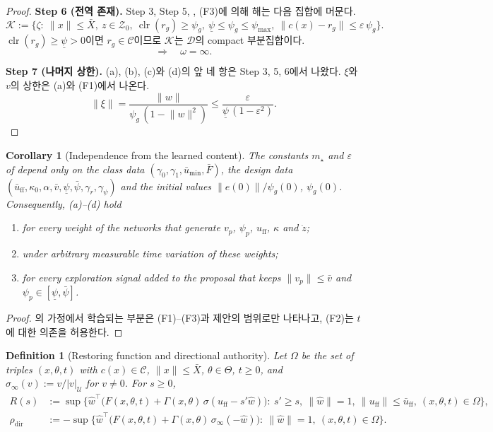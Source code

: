 \documentclass[11pt]{article}\usepackage[margin=1in]{geometry}\usepackage{amsmath,amssymb,amsthm,mathtools}\usepackage{graphicx}\graphicspath{{figures/}{../figures/}{figs/}{./}}\usepackage{enumitem}\usepackage{hyperref}\usepackage{cleveref}\usepackage{tikz}\usetikzlibrary{arrows.meta,positioning,calc,shapes.geometric}\usepackage{float}\usepackage[most]{tcolorbox}\usepackage{kotex}\usepackage{booktabs}\emergencystretch=1.6em\tolerance=2000 \crefname{assumption}{Assumption}{Assumptions}\Crefname{assumption}{Assumption}{Assumptions}\crefname{definition}{Definition}{Definitions}\Crefname{definition}{Definition}{Definitions}\crefname{proposition}{Proposition}{Propositions}\Crefname{proposition}{Proposition}{Propositions}\crefname{fact}{Fact}{Facts}\Crefname{fact}{Fact}{Facts} \newtheorem{assumption}{Assumption}\newtheorem{definition}{Definition}\newtheorem{lemma}{Lemma}\newtheorem{proposition}{Proposition}\newtheorem{theorem}{Theorem}\newtheorem{corollary}{Corollary}\newtheorem{fact}{Fact}\theoremstyle{remark}\newtheorem{remark}{Remark} \newcommand{\R}{\mathbb{R}}\newcommand{\U}{\mathcal U}
\newcommand{\Cset}{\mathcal C}\newcommand{\Pcl}{\mathcal P}\newcommand{\Zset}{\mathcal Z_0}\newcommand{\Xset}{\mathcal X_0}
\DeclareMathOperator{\clr}{clr}\newcommand{\norm}[1]{\lVert #1\rVert}\newcommand{\what}{\hat w}
\begin{document}
\begin{proof}
\textbf{Step 6 (전역 존재).} Step 3, Step 5, , (F3)에 의해 해는 다음 집합에 머문다.
\[
\mathcal K:=\big\{\zeta:\ \norm{x}\le\bar X,\ z\in\Zset,\ \clr(r_g)\ge\psi_g,\ \underline\psi\le\psi_g\le\psi_{\max},\ \norm{c(x)-r_g}\le\varepsilon\,\psi_g\big\}.
\]
$\clr(r_g)\ge\underline\psi>0$이면 $r_g\in\Cset$이므로 $\mathcal K$는 $\mathcal D$의 compact 부분집합이다.
\[
\Longrightarrow\quad \omega=\infty .
\]

\textbf{Step 7 (나머지 상한).} (a), (b), (c)와 (d)의 앞 네 항은 Step 3, 5, 6에서 나왔다. $\xi$와 $v$의 상한은 (a)와 (F1)에서 나온다.
\[
\norm{\xi}=\frac{\norm{w}}{\psi_g\,(1-\norm{w}^2)}\le\frac{\varepsilon}{\underline\psi\,(1-\varepsilon^2)} .
\]
\end{proof}

\begin{corollary}[Independence from the learned content]
\label{cor:learn}
The constants $m_\star$ and $\varepsilon$ of  depend only on the class data $(\gamma_0,\gamma_1,\bar u_{\min},\bar F)$, the design data $(\bar u_{\mathrm{ff}},\kappa_0,\alpha,\bar v,\underline\psi,\bar\psi,\gamma_r,\gamma_\psi)$ and the initial values $\norm{e(0)}/\psi_g(0)$, $\psi_g(0)$. Consequently, (a)--(d) hold
\begin{enumerate}[label=(\alph*)]
\item for every weight of the networks that generate $v_p$, $\psi_p$, $u_{\mathrm{ff}}$, $\kappa$ and $\dot z$;
\item under arbitrary measurable time variation of these weights;
\item for every exploration signal added to the proposal that keeps $\norm{v_p}\le\bar v$ and $\psi_p\in[\underline\psi,\bar\psi]$.
\end{enumerate}
\end{corollary}

\begin{proof}
의 가정에서 학습되는 부분은 (F1)--(F3)과 제안의 범위로만 나타나고, (F2)는 $t$에 대한 의존을 허용한다.
\end{proof}

\begin{definition}[Restoring function and directional authority]
\label{def:restore}
Let $\Omega$ be the set of triples $(x,\theta,t)$ with $c(x)\in\Cset$, $\norm{x}\le\bar X$, $\theta\in\Theta$, $t\ge0$, and $\sigma_\infty(v):=v/|v|_{\U}$ for $v\ne0$. For $s\ge0$,
\begin{align}
R(s)&:=\sup\Big\{\what^\top\big(F(x,\theta,t)+\Gamma(x,\theta)\,\sigma(u_{\mathrm{ff}}-s'\what)\big):\ s'\ge s,\ \norm{\what}=1,\ \norm{u_{\mathrm{ff}}}\le\bar u_{\mathrm{ff}},\ (x,\theta,t)\in\Omega\Big\}, \label{eq:R}\\
\rho_{\mathrm{dir}}&:=-\sup\Big\{\what^\top\big(F(x,\theta,t)+\Gamma(x,\theta)\,\sigma_\infty(-\what)\big):\ \norm{\what}=1,\ (x,\theta,t)\in\Omega\Big\}. \label{eq:rhodir}
\end{align}
\end{definition}
\end{document}
